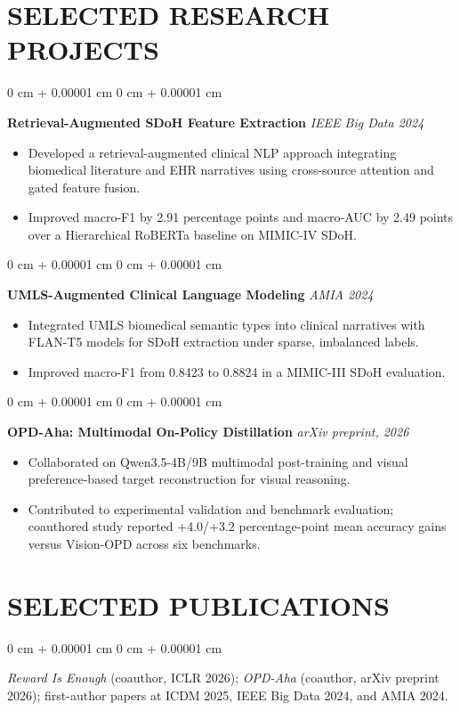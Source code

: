 \documentclass[10pt, letterpaper]{article}
\newenvironment{highlights}{
    \begin{itemize}[
        topsep=0.03 cm,
        parsep=0.02 cm,
        partopsep=0pt,
        itemsep=0pt,
        leftmargin=0 cm + 10pt
    ]
}{
    \end{itemize}
} %
\newenvironment{onecolentry}{
    \begin{adjustwidth}{
        0 cm + 0.00001 cm
    }{
        0 cm + 0.00001 cm
    }
}{
    \end{adjustwidth}
} %
\begin{document}
\section{SELECTED RESEARCH PROJECTS}
\begin{onecolentry}
\textbf{Retrieval-Augmented SDoH Feature Extraction} \hfill \textit{IEEE Big Data 2024}
\begin{highlights}
\item Developed a retrieval-augmented clinical NLP approach integrating biomedical literature and EHR narratives using cross-source attention and gated feature fusion.
\item Improved macro-F1 by 2.91 percentage points and macro-AUC by 2.49 points over a Hierarchical RoBERTa baseline on MIMIC-IV SDoH.
\end{highlights}
\end{onecolentry}
\vspace{0.02 cm}
\begin{onecolentry}
\textbf{UMLS-Augmented Clinical Language Modeling} \hfill \textit{AMIA 2024}
\begin{highlights}
\item Integrated UMLS biomedical semantic types into clinical narratives with FLAN-T5 models for SDoH extraction under sparse, imbalanced labels.
\item Improved macro-F1 from 0.8423 to 0.8824 in a MIMIC-III SDoH evaluation.
\end{highlights}
\end{onecolentry}
\vspace{0.02 cm}
\begin{onecolentry}
\textbf{OPD-Aha: Multimodal On-Policy Distillation} \hfill \textit{arXiv preprint, 2026}
\begin{highlights}
\item Collaborated on Qwen3.5-4B/9B multimodal post-training and visual preference-based target reconstruction for visual reasoning.
\item Contributed to experimental validation and benchmark evaluation; coauthored study reported +4.0/+3.2 percentage-point mean accuracy gains versus Vision-OPD across six benchmarks.
\end{highlights}
\end{onecolentry}
\vspace{0.02 cm}
\section{SELECTED PUBLICATIONS}
\begin{onecolentry}
\textit{Reward Is Enough} (coauthor, ICLR 2026); \textit{OPD-Aha} (coauthor, arXiv preprint 2026); first-author papers at ICDM 2025, IEEE Big Data 2024, and AMIA 2024.
\end{onecolentry}
\end{document}
